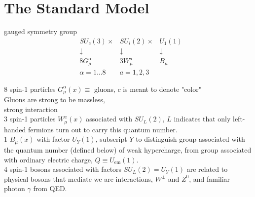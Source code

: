 \part{The Standard Model}


gauged symmetry group 
\[
\begin{aligned}
& SU_c(3) \times & SU_i(2) \times & U_1(1) \\	
& \downarrow & \downarrow & \downarrow \\
& 8G^{\alpha}_{\mu} & 3 W_{\mu}^a & B_{\mu} \\
& \alpha = 1 \dots 8 & a = 1, 2, 3 & 
\end{aligned}
\]

8 spin-1 particles $G^{\alpha}_{\mu}(x) \equiv $ gluons, $c$ is meant to denote "color" \\
Gluons are strong to be massless, \\
strong interaction \\

3 spin-1 particles $W^a_{\mu}(x)$ associated with $SU_L(2)$, $L$ indicates that only left-handed fermions turn out to carry this quantum number. \\

1 $B_{\mu}(x)$ with factor $U_Y(1)$, subscript $Y$ to distinguish group associated with the quantum number (defined below) of weak hypercharge, from group associated with ordinary electric charge, $Q \equiv U_{\text{em}}(1)$. \\

4 spin-1 bosons associated with factors $SU_L(2) = U_Y(1)$ are related to physical bosons that mediate we are interactions, $W^{\pm}$ and $Z^0$, and familiar photon $\gamma$ from QED.

